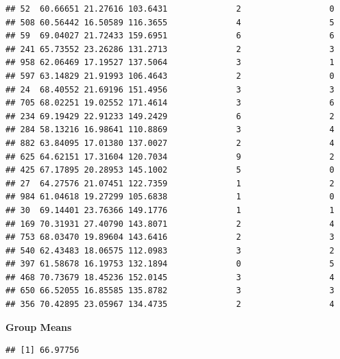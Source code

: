 \documentclass[]{article}
\newenvironment{Shaded}{\begin{snugshade}}{\end{snugshade}}
\newcommand{\KeywordTok}[1]{\textcolor[rgb]{0.13,0.29,0.53}{\textbf{#1}}}
\newcommand{\StringTok}[1]{\textcolor[rgb]{0.31,0.60,0.02}{#1}}
\newcommand{\OperatorTok}[1]{\textcolor[rgb]{0.81,0.36,0.00}{\textbf{#1}}}
\newcommand{\NormalTok}[1]{#1}
\begin{document}
\begin{verbatim}
## 52  60.66651 21.27616 103.6431              2                  0
## 508 60.56442 16.50589 116.3655              4                  5
## 59  69.04027 21.72433 159.6951              6                  6
## 241 65.73552 23.26286 131.2713              2                  3
## 958 62.06469 17.19527 137.5064              3                  1
## 597 63.14829 21.91993 106.4643              2                  0
## 24  68.40552 21.69196 151.4956              3                  3
## 705 68.02251 19.02552 171.4614              3                  6
## 234 69.19429 22.91233 149.2429              6                  2
## 284 58.13216 16.98641 110.8869              3                  4
## 882 63.84095 17.01380 137.0027              2                  4
## 625 64.62151 17.31604 120.7034              9                  2
## 425 67.17895 20.28953 145.1002              5                  0
## 27  64.27576 21.07451 122.7359              1                  2
## 984 61.04618 19.27299 105.6838              1                  0
## 30  69.14401 23.76366 149.1776              1                  1
## 169 70.31931 27.40790 143.8071              2                  4
## 753 68.03470 19.89604 143.6416              2                  3
## 540 62.43483 18.06575 112.0983              3                  2
## 397 61.58678 16.19753 132.1894              0                  5
## 468 70.73679 18.45236 152.0145              3                  4
## 650 66.52055 16.85585 135.8782              3                  3
## 356 70.42895 23.05967 134.4735              2                  4
\end{verbatim}

\textbf{Group Means}

\begin{Shaded}
\end{Shaded}

\begin{verbatim}
## [1] 66.97756
\end{verbatim}

\begin{Shaded}
\end{Shaded}
\end{document}
